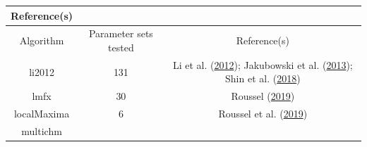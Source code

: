\documentclass[twoside,12pt,final]{ucthesis-CA2012}
\begin{document}
\begin{ucmainmatter}
\begin{longtable}[]{@{}ccc@{}}
\begin{minipage}[b]{0.34\columnwidth}
Reference(s)\strut
\end{minipage}\tabularnewline
\midrule
\endfirsthead
\toprule
\begin{minipage}[b]{0.18\columnwidth}\centering\strut
Algorithm\strut
\end{minipage} & \begin{minipage}[b]{0.22\columnwidth}\centering\strut
Parameter sets tested\strut
\end{minipage} & \begin{minipage}[b]{0.34\columnwidth}\centering\strut
Reference(s)\strut
\end{minipage}\tabularnewline
\midrule
\endhead
\begin{minipage}[t]{0.18\columnwidth}\centering\strut
li2012\strut
\end{minipage} & \begin{minipage}[t]{0.22\columnwidth}\centering\strut
131\strut
\end{minipage} & \begin{minipage}[t]{0.34\columnwidth}\centering\strut
Li et al. (\protect\hyperlink{ref-li2012}{2012}); Jakubowski et al.
(\protect\hyperlink{ref-jakubowski2013}{2013}); Shin et al.
(\protect\hyperlink{ref-shin2018}{2018})\strut
\end{minipage}\tabularnewline
\begin{minipage}[t]{0.18\columnwidth}\centering\strut
lmfx\strut
\end{minipage} & \begin{minipage}[t]{0.22\columnwidth}\centering\strut
30\strut
\end{minipage} & \begin{minipage}[t]{0.34\columnwidth}\centering\strut
Roussel (\protect\hyperlink{ref-roussel2019a}{2019})\strut
\end{minipage}\tabularnewline
\begin{minipage}[t]{0.18\columnwidth}\centering\strut
localMaxima\strut
\end{minipage} & \begin{minipage}[t]{0.22\columnwidth}\centering\strut
6\strut
\end{minipage} & \begin{minipage}[t]{0.34\columnwidth}\centering\strut
Roussel et al. (\protect\hyperlink{ref-roussel2019}{2019})\strut
\end{minipage}\tabularnewline
\begin{minipage}[t]{0.18\columnwidth}\centering\strut
multichm\strut
\end{minipage} & \begin{minipage}[t]{0.22\columnwidth}\centering\strut

\end{minipage}
\end{longtable}
\end{ucmainmatter}
\end{document}
